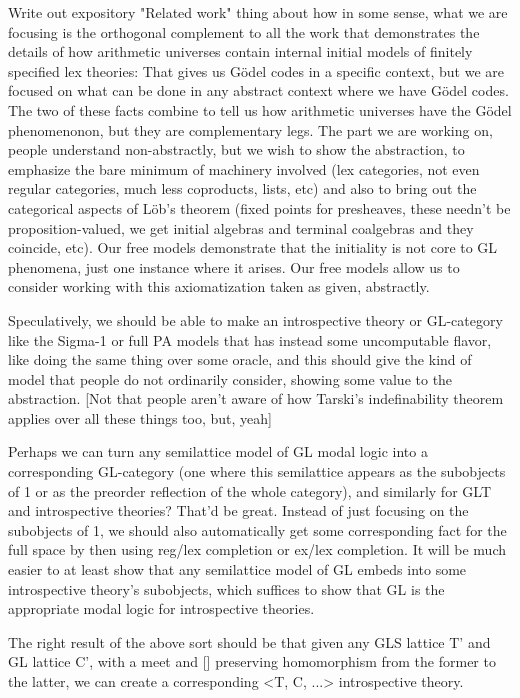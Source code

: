 Write out expository "Related work" thing about how in some sense, what we are focusing is the orthogonal complement to all the work that demonstrates the details of how arithmetic universes contain internal initial models of finitely specified lex theories: That gives us Gödel codes in a specific context, but we are focused on what can be done in any abstract context where we have Gödel codes. The two of these facts combine to tell us how arithmetic universes have the Gödel phenomenonon, but they are complementary legs. The part we are working on, people understand non-abstractly, but we wish to show the abstraction, to emphasize the bare minimum of machinery involved (lex categories, not even regular categories, much less coproducts, lists, etc) and also to bring out the categorical aspects of Löb's theorem (fixed points for presheaves, these needn't be proposition-valued, we get initial algebras and terminal coalgebras and they coincide, etc). Our free models demonstrate that the initiality is not core to GL phenomena, just one instance where it arises. Our free models allow us to consider working with this axiomatization taken as given, abstractly.

Speculatively, we should be able to make an introspective theory or GL-category like the Sigma-1 or full PA models that has instead some uncomputable flavor, like doing the same thing over some oracle, and this should give the kind of model that people do not ordinarily consider, showing some value to the abstraction. [Not that people aren't aware of how Tarski's indefinability theorem applies over all these things too, but, yeah]

Perhaps we can turn any semilattice model of GL modal logic into a corresponding GL-category (one where this semilattice appears as the subobjects of 1 or as the preorder reflection of the whole category), and similarly for GLT and introspective theories? That'd be great. Instead of just focusing on the subobjects of 1, we should also automatically get some corresponding fact for the full space by then using reg/lex completion or ex/lex completion. It will be much easier to at least show that any semilattice model of GL embeds into some introspective theory's subobjects, which suffices to show that GL is the appropriate modal logic for introspective theories.

The right result of the above sort should be that given any GLS lattice T' and GL lattice C', with a meet and [] preserving homomorphism from the former to the latter, we can create a corresponding <T, C, ...> introspective theory.

